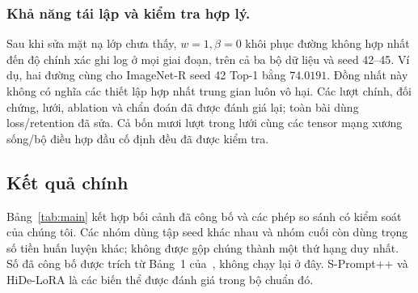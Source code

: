 \documentclass[runningheads]{llncs}
\begin{document}
\subsubsection{Khả năng tái lập và kiểm tra hợp lý.}
Sau khi sửa mặt nạ lớp chưa thấy, $w=1,\beta=0$ khôi phục đường không hợp nhất
đến độ chính xác ghi log ở mọi giai đoạn, trên cả ba bộ dữ liệu và seed 42--45.
Ví dụ, hai đường cùng cho ImageNet-R seed 42 Top-1 bằng $74.0191$.
Đồng nhất
này không có nghĩa các thiết lập hợp nhất trung gian luôn vô hại. Các lượt
chính, đối chứng, lưới, ablation và chẩn đoán đã được đánh giá lại; toàn bài
dùng loss/retention đã sửa. Cả bốn mươi lượt trong lưới cùng các tensor mạng
xương sống/bộ điều hợp đầu cố định đều đã được kiểm tra.

\subsection{Kết quả chính}
\label{sec:results}

Bảng~\ref{tab:main} kết hợp bối cảnh đã công bố và các phép so sánh có kiểm soát
của chúng tôi. Các nhóm dùng tập seed khác nhau và nhóm cuối còn dùng trọng số
tiền huấn luyện khác; không được gộp chúng thành một thứ hạng duy nhất. Số đã
công bố được trích từ Bảng~1 của~\cite{ref_hrmpet}, không chạy lại ở đây.
S-Prompt++ và HiDe-LoRA là các biến thể được đánh giá trong bộ chuẩn đó.
\end{document}
